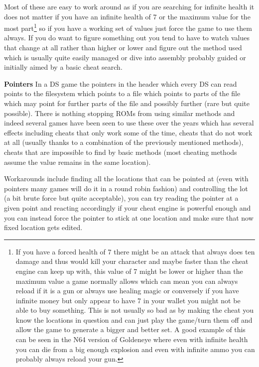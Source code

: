 \documentclass[
]{book}
\begin{document}
Most of these are easy to work around as if you are searching for infinite health it does not matter if you have an infinite health of 7 or the maximum value for the most part\footnote{If you have a forced health of 7 there might be an attack that always does ten damage and thus would kill your character and maybe faster than the cheat engine can keep up with, this value of 7 might be lower or higher than the maximum value a game normally allows which can mean you can always reload if it is a gun or always use healing magic or conversely if you have infinite money but only appear to have 7 in your wallet you might not be able to buy something. This is not usually so bad as by making the cheat you know the locations in question and can just play the game/turn them off and allow the game to generate a bigger and better set.
  A good example of this can be seen in the N64 version of Goldeneye where even with infinite health you can die from a big enough explosion and even with infinite ammo you can probably always reload your gun.} so if you have a working set of values just force the game to use them always. If you do want to figure something out you tend to have to watch values that change at all rather than higher or lower and figure out the method used which is usually quite easily managed or dive into assembly probably guided or initially aimed by a basic cheat search.

\textbf{Pointers} In a DS game the pointers in the header which every DS can read points to the filesystem which points to a file which points to parts of the file which may point for further parts of the file and possibly further (rare but quite possible). There is nothing stopping ROMs from using similar methods and indeed several games have been seen to use these over the years which has several effects including cheats that only work some of the time, cheats that do not work at all (usually thanks to a combination of the previously mentioned methods), cheats that are impossible to find by basic methods (most cheating methods assume the value remains in the same location).

Workarounds include finding all the locations that can be pointed at (even with pointers many games will do it in a round robin fashion) and controlling the lot (a bit brute force but quite acceptable), you can try reading the pointer at a given point and reacting accordingly if your cheat engine is powerful enough and you can instead force the pointer to stick at one location and make sure that now fixed location gets edited.
\end{document}
